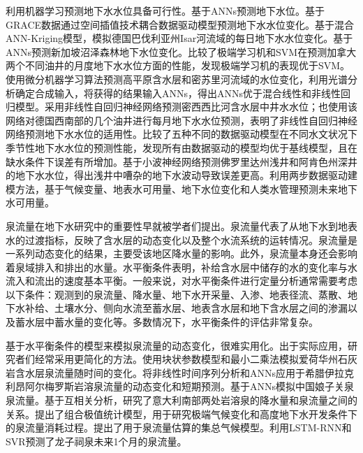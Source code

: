 利用机器学习预测地下水水位具备可行性。\citet{coppola2003artificial}基于ANNs预测地下水位。\citet{sun2013predicting}基于GRACE数据通过空间插值技术耦合数据驱动模型预测地下水水位变化。\citet{tapoglou2014spatio}基于混合ANN-Kriging模型，模拟德国巴伐利亚州Isar河流域的每日地下水水位变化。\citet{Sun2015Technical}基于ANNs预测新加坡沼泽森林地下水位变化。\citet{yadav2017assessing}比较了极端学习机和SVM在预测加拿大两个不同油井的月度地下水水位方面的性能，发现极端学习机的表现优于SVM。\citet{sahoo2017machine}使用微分机器学习算法预测高平原含水层和密苏里河流域的水位变化，利用光谱分析确定合成输入，将获得的结果输入ANNs，得出ANNs优于混合线性和非线性回归模型。\citet{guzman2017use}采用非线性自回归神经网络预测密西西比河含水层中井水水位；\citet{wunsch2018forecasting}也使用该网络对德国西南部的几个油井进行每月地下水水位预测，表明了非线性自回归神经网络预测地下水水位的适用性。\citet{amaranto2018semi}比较了五种不同的数据驱动模型在不同水文状况下季节性地下水水位的预测性能，发现所有由数据驱动的模型均优于基线模型，且在缺水条件下误差有所增加。\citet{Rakhshandehroo2018Long}基于小波神经网络预测佛罗里达州浅井和阿肯色州深井的地下水水位，得出浅井中嘈杂的地下水波动导致误差更高。\citet{amaranto2019spatially}利用两步数据驱动建模方法，基于气候变量、地表水可用量、地下水位变化和人类水管理预测未来地下水可用量。

泉流量在地下水研究中的重要性早就被学者们提出\citep{toth1971groundwater,toth1999groundwater}。泉流量代表了从地下水到地表水的过渡指标，反映了含水层的动态变化以及整个水流系统的运转情况。泉流量是一系列动态变化的结果，主要受该地区降水量的影响。此外，泉流量本身还会影响着泉域排入和排出的水量。水平衡条件表明，补给含水层中储存的水的变化率与水流入和流出的速度基本平衡。一般来说，对水平衡条件进行定量分析通常需要考虑以下条件：观测到的泉流量、降水量、地下水开采量、入渗、地表径流、蒸散、地下水补给、土壤水分、侧向水流至蓄水层、地表含水层和地下含水层之间的渗漏以及蓄水层中蓄水量的变化等。多数情况下，水平衡条件的评估非常复杂。

基于水平衡条件的模型来模拟泉流量的动态变化，很难实用化。出于实际应用，研究者们经常采用更简化的方法。\citet{zhang1996simulation}使用块状参数模型和最小二乘法模拟爱荷华州石灰岩含水层泉流量随时间的变化。\citet{lambrakis2000nonlinear}将非线性时间序列分析和ANNs应用于希腊伊拉克利昂阿尔梅罗斯岩溶泉流量的动态变化和短期预测。\citet{hu2008simulation}基于ANNs模拟中国娘子关泉泉流量。\citet{fiorillo2010relation}基于互相关分析，研究了意大利南部两处岩溶泉的降水量和泉流量之间的关系。\citet{fan2013assembled}提出了组合极值统计模型，用于研究极端气候变化和高度地下水开发条件下的泉流量消耗过程。\citet{diodato2014predicting}提出了用于泉流量估算的集总气候模型。\citet{cheng2021machine}利用LSTM-RNN和SVR预测了龙子祠泉未来1个月的泉流量。


